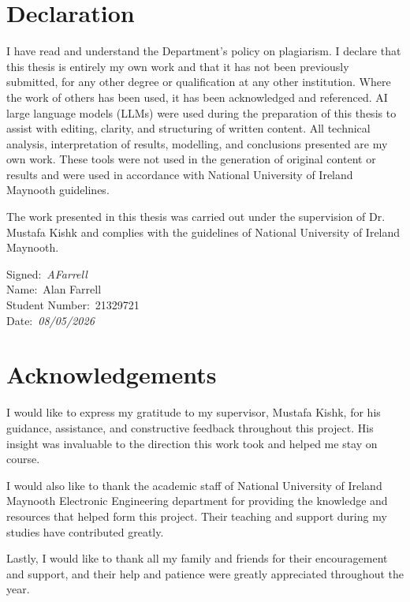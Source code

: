 \documentclass{report}
\begin{document}
\section*{Declaration}
I have read and understand the Department's policy on plagiarism. I declare that this thesis is entirely my own work and that it has not been previously submitted, for any other degree or qualification at any other institution. Where the work of others has been used, it has been acknowledged and referenced.
AI large language models (LLMs) were used during the preparation of this thesis to assist with editing, clarity, and structuring of written content. All technical analysis, interpretation of results, modelling, and conclusions presented are my own work. These tools were not used in the generation of original content or results and were used in accordance with National University of Ireland Maynooth guidelines.


  \noindent
  The work presented in this thesis was carried out under the supervision of Dr. Mustafa Kishk and complies with the guidelines of National University of Ireland Maynooth.

  \vspace{2cm}

\noindent
Signed:\ \textit{AFarrell} \\[1.2em]
Name:\ Alan Farrell \\[0.6em]
Student Number:\ 21329721 \\[0.6em]
Date:\ \textit{08/05/2026}


\clearpage
\section*{Acknowledgements}
I would like to express my gratitude to my supervisor, Mustafa Kishk, for his guidance, assistance, and constructive feedback throughout this project. His insight was invaluable to the direction this work took and helped me stay on course. 

I would also like to thank the academic staff of National University of Ireland Maynooth Electronic Engineering department for providing the knowledge and resources that helped form this project. Their teaching and support during my studies have contributed greatly. 

Lastly, I would like to thank all my family and friends for their encouragement and support, and their help and patience were greatly appreciated throughout the year. 



\clearpage
{}
\setcounter{page}{1}








\FloatBarrier
\newpage




\end{document}
